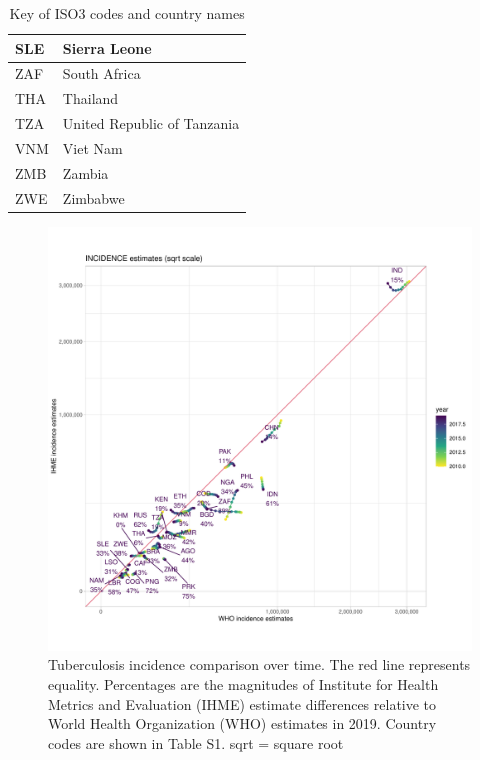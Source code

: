 \documentclass[12pt]{article}
\begin{document}
\begin{table}[]
\begin{tabular}{|l|l|}
SLE           & Sierra Leone                          \\ \hline
ZAF           & South Africa                          \\ \hline
THA           & Thailand                              \\ \hline
TZA           & United Republic of Tanzania           \\ \hline
VNM           & Viet Nam                              \\ \hline
ZMB           & Zambia                                \\ \hline
ZWE           & Zimbabwe                              \\ \hline
\end{tabular}
\caption{Key of ISO3 codes and country names}
\end{table}


\begin{figure}
  \centering
  \includegraphics[width=1\textwidth]{../plots/aF2a.pdf}
  \caption[Incidence comparison over time]{Tuberculosis incidence comparison over time. The
    red line represents equality. Percentages are the magnitudes of Institute for Health Metrics
    and Evaluation (IHME) estimate differences relative to World Health Organization (WHO)
    estimates in 2019. Country codes are shown in Table S1. sqrt = square root}
\end{figure}
\end{document}
